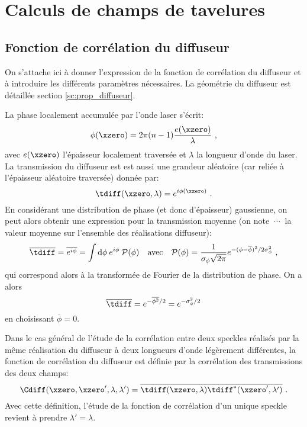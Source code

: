 \chapter{Calculs de champs de tavelures}
\label{ch:anex_speckle}

\section{Fonction de corrélation du diffuseur}
On s'attache ici à donner l'expression de la fonction de corrélation du diffuseur et à introduire les différents paramètres nécessaires. La géométrie du diffuseur est détaillée section \ref{sc:prop_diffuseur}.

La phase localement accumulée par l'onde laser s'écrit:
\begin{equation}
\phi(\xzero)=2\pi (n-1) \frac{e(\xzero)}{\lambda} \text{ ,}
\end{equation}
avec $e(\xzero)$ l'épaisseur localement traversée et $\lambda$ la longueur d'onde du laser. La transmission du diffuseur est est aussi une grandeur aléatoire (car reliée à l'épaisseur aléatoire traversée) donnée par:
\begin{equation}
\tdiff(\xzero,\lambda)=e^{i \phi(\xzero)} \text{ .}
\end{equation}
En considérant une distribution de phase (et donc d'épaisseur) gaussienne, on peut alors obtenir une expression pour la transmission moyenne (on note $\overline{\:\cdots\:}$ la valeur moyenne sur l'ensemble des réalisations diffuseur):
\begin{equation}
\overline{\tdiff}= \overline{e^{i \phi}} = \int{ \mathrm{d}\phi \: e^{i \phi} \: \mathcal{P}(\phi)} \quad \text{avec} \quad \mathcal{P}(\phi) = \frac{1}{\sigma_{\phi} \sqrt{2 \pi}} e^{-(\phi - \overline{\phi})^2 /2 \sigma_{\phi}^2} \text{ ,}
\end{equation}
qui correspond alors à la transformée de Fourier de la distribution de phase. On a alors
\begin{equation}
\overline{\tdiff} = e^{-\overline{\phi^2}/2} = e^{-\sigma_{\phi}^2/2}
\end{equation}
en choisissant $\overline{\phi}=0$. 

Dans le cas général de l'étude de la corrélation entre deux speckles réalisés par la même réalisation du diffuseur à deux longueurs d'onde légèrement différentes, la fonction de corrélation du diffuseur est définie par la corrélation des transmissions des deux champs:
\begin{equation}
\Cdiff(\xzero,\xzero',\lambda,\lambda')=\overline{\tdiff(\xzero,\lambda)\tdiff^*(\xzero',\lambda')} \text{ .}
\end{equation}
Avec cette définition, l'étude de la fonction de corrélation d'un unique speckle revient à prendre $\lambda'=\lambda$. 

